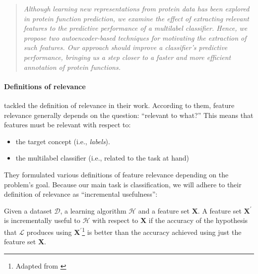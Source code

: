 \begin{quote}
  \itshape
  \small
  Although learning new representations from protein data has been explored
  in protein function prediction, we examine the effect of extracting
  relevant features to the predictive performance of a multilabel classifier.
  Hence, we propose two autoencoder-based techniques for motivating the
  extraction of such features. Our approach should improve a classifier's
  predictive performance, bringing us a step closer to a faster and more
  efficient annotation of protein functions.
\end{quote}

\paragraph{Definitions of relevance}
\cite{blum1997selection} tackled the definition of relevance in their work.
According to them, feature relevance generally depends on the question:
``relevant to what?'' This means that features must be relevant
with respect to:
\begin{itemize}
  \item the target concept (i.e., \textit{labels}). \item the multilabel
  classifier (i.e., related to the task at hand)
\end{itemize}

\par They formulated various definitions of feature relevance depending on the
problem's goal. Because our main task is classification, we will adhere to
their definition of relevance as ``incremental usefulness'':

\begin{definition}
  \label{DefRelevance}
   Given a dataset $\mathcal{D}$, a learning algorithm $\mathcal{H}$ and a
   feature set $\mathbf{X}$. A feature set $\mathbf{X}^{\prime}$ is
   incrementally useful to $\mathcal{H}$ with respect to $\mathbf{X}$ if the
   accuracy of the hypothesis that $\mathcal{L}$ produces using
   $\mathbf{X}^{\prime}$\footnote{Adapted from \cite{blum1997selection}}
   is better than the accuracy achieved using just the
   feature set $\mathbf{X}$.
\end{definition}

